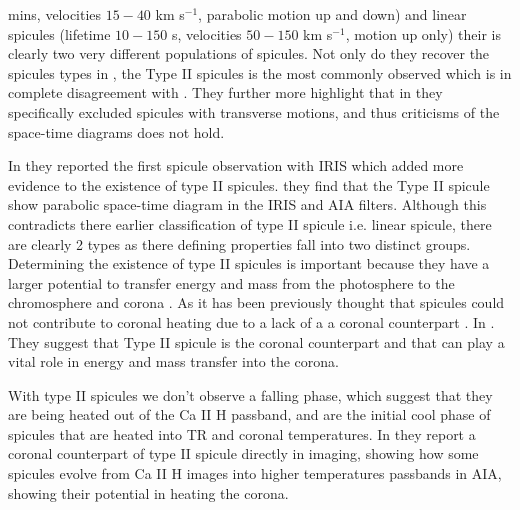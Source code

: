 \documentclass[12pt]{ociamthesis}
\begin{document}
mins, velocities $15-40$ km s$^{-1}$, parabolic motion up and down) and linear spicules (lifetime $10-150$ s, velocities $50-150$ km s$^{-1}$, motion up only) their is clearly two very different populations of spicules. Not only do they recover the spicules types in \cite{Pontieu2007PASJ}, the Type II spicules is the most commonly observed which is in complete disagreement with \cite{Zhang2012ApJ}. They further more highlight that in \cite{Pontieu2007PASJ} they specifically excluded spicules with transverse motions, and thus \cite{Zhang2012ApJ} criticisms of the space-time diagrams does not hold. \\          
\par In \cite{Pereira2014ApJ} they reported the first spicule observation with IRIS which added more evidence to the existence of type II spicules. they find that the Type II spicule show parabolic space-time diagram in the IRIS and AIA filters. Although this contradicts there earlier classification of type II spicule i.e. linear spicule, there are clearly 2 types as there defining properties fall into two distinct groups. Determining the existence of type II spicules is important because they have a larger potential to transfer energy and mass from the photosphere to the chromosphere and corona \citep{Pereira2012}. As it has been previously thought that spicules could not contribute to coronal heating due to a lack of a a coronal counterpart \citep{Withbroe1983ApJ}. In \cite{DePontieu2009}. They suggest that Type II spicule is the coronal counterpart and that can play a vital role in energy and mass transfer into the corona. \\
\par With type II spicules we don't observe a falling phase, which suggest that they are being heated out of the Ca II H passband, and are the initial cool phase of spicules that are heated into TR and coronal temperatures. In \cite{Pontieu2011Sci} they report a coronal counterpart of type II spicule directly in imaging, showing how some spicules evolve from Ca II H images into higher temperatures passbands in AIA, showing their potential in heating the corona.
\end{document}
